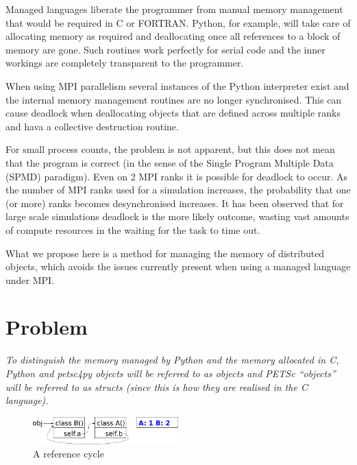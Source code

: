\documentclass[10pt,journal,compsoc]{IEEEtran}
\begin{document}
Managed languages liberate the programmer from manual memory management that would be required in C or FORTRAN.
Python, for example, will take care of allocating memory as required and deallocating once all references to a block of memory are gone.
Such routines work perfectly for serial code and the inner workings are completely transparent to the programmer.

When using MPI parallelism several instances of the Python interpreter exist and the internal memory management routines are no longer synchronised.
This can cause deadlock when deallocating objects that are defined across multiple ranks and hava a collective destruction routine.

For small process counts, the problem is not apparent, but this does not mean that the program is correct (in the sense of the Single Program Multiple Data (SPMD) paradigm).
Even on 2 MPI ranks it is possible for deadlock to occur.
As the number of MPI ranks used for a simulation increases, the probability that one (or more) ranks becomes desynchronised increases.
It has been observed that for large scale simulations deadlock is the more likely outcome, wasting vast amounts of compute resources in the waiting for the task to time out.

What we propose here is a method for managing the memory of distributed objects, which avoids the issues currently present when using a managed language under MPI.



\section{Problem}
\label{sec:problem}


\emph{To distinguish the memory managed by Python and the memory allocated in C, Python and petsc4py objects will be referred to as objects and PETSc ``objects'' will be referred to as structs (since this is how they are realised in the C language).}

\begin{figure}
	\includegraphics[width=0.5\textwidth]{gc_generational/2.png}
	\caption{A reference cycle}
	\label{fig:ref_cycle}
\end{figure}
\end{document}
